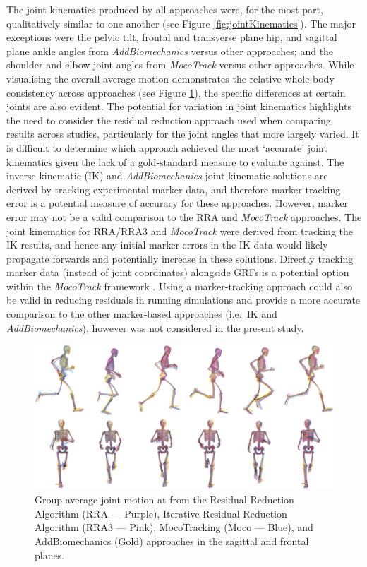 \documentclass[]{elsarticle} %
\begin{document}
The joint kinematics produced by all approaches were, for the most part,
qualitatively similar to one another (see Figure
\ref{fig:jointKinematics}). The major exceptions were the pelvic tilt,
frontal and transverse plane hip, and sagittal plane ankle angles from
\emph{AddBiomechanics} versus other approaches; and the shoulder and
elbow joint angles from \emph{MocoTrack} versus other approaches. While
visualising the overall average motion demonstrates the relative
whole-body consistency across approaches (see Figure
\ref{fig:overallMotion}), the specific differences at certain joints are
also evident. The potential for variation in joint kinematics highlights
the need to consider the residual reduction approach used when comparing
results across studies, particularly for the joint angles that more
largely varied. It is difficult to determine which approach achieved the
most `accurate' joint kinematics given the lack of a gold-standard
measure to evaluate against. The inverse kinematic (IK) and
\emph{AddBiomechanics} joint kinematic solutions are derived by tracking
experimental marker data, and therefore marker tracking error is a
potential measure of accuracy for these approaches. However, marker
error may not be a valid comparison to the RRA and \emph{MocoTrack}
approaches. The joint kinematics for RRA/RRA3 and \emph{MocoTrack} were
derived from tracking the IK results, and hence any initial marker
errors in the IK data would likely propagate forwards and potentially
increase in these solutions. Directly tracking marker data (instead of
joint coordinates) alongside GRFs is a potential option within the
\emph{MocoTrack} framework \citep{Nitschke2023}. Using a marker-tracking
approach could also be valid in reducing residuals in running
simulations and provide a more accurate comparison to the other
marker-based approaches (i.e.~IK and \emph{AddBiomechanics}), however
was not considered in the present study.

\begin{figure}

{\centering \includegraphics[width=0.9\linewidth]{../results/HamnerDelpDataset/figures/meanKinematics_gaitCycleVisualised_combinedPlanes} 

}

\caption{Group average joint motion at from the Residual Reduction Algorithm (RRA — Purple), Iterative Residual Reduction Algorithm  (RRA3 — Pink), MocoTracking (Moco — Blue), and AddBiomechanics (Gold) approaches in the sagittal and frontal planes.}\label{fig:overallMotion}
\end{figure}
\end{document}
